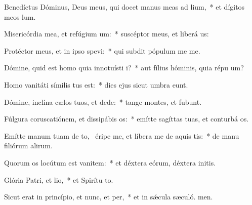 \item Benedíctus Dóminus, Deus meus, qui docet manus meas ad lium,~* et dígitos meos  lum.
\item Misericórdia mea, et refúgium um:~* suscéptor meus, et liberá us:
\item Protéctor meus, et in ipso spevi:~* qui subdit pópulum me  me.
\item Dómine, quid est homo quia innotuísti i?~* aut fílius hóminis, quia répu um?
\item Homo vanitáti símilis tus est:~* dies ejus sicut umbra eunt.
\item Dómine, inclína cælos tuos, et dede:~* tange montes, et fubunt.
\item Fúlgura coruscatiónem, et dissipábis os:~* emítte sagíttas tuas, et conturbá os.
\item Emítte manum tuam de to,~\pscross{} éripe me, et líbera me de aquis tis:~* de manu filiórum alirum.
\item Quorum os locútum est vanitem:~* et déxtera eórum, déxtera initis.
\item Glória Patri, et lio,~* et Spirítu to.
\item Sicut erat in princípio, et nunc, et per,~* et in sǽcula sæculó. men.
